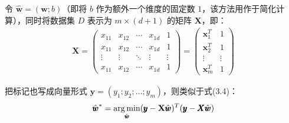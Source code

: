 \documentclass[../studies-ml.tex]{subfiles}
\begin{document}
\bigbreak

令 $\hat{\pmb{w}} = (\pmb{w}; b)$（即将 $b$ 作为额外一个维度的固定数 $1$，该方法用作于简化计算），同时将数据集 $D$ 表示为 $m \times (d + 1)$ 的矩阵
$\mathbf{X}$，即：
\begin{align*}
  \pmb{X} =
  \left(
  \begin{matrix}
      x_{11} & x_{12} & \cdots & x_{1d} & 1      \\
      x_{11} & x_{12} & \cdots & x_{1d} & 1      \\
      \vdots & \vdots & \ddots & \vdots & \vdots \\
      x_{11} & x_{12} & \cdots & x_{1d} & 1
    \end{matrix}
  \right) =
  \left(
  \begin{matrix}
      \pmb{x}_1^T & 1      \\
      \pmb{x}_2^T & 1      \\
      \vdots      & \vdots \\
      \pmb{x}_m^T & 1
    \end{matrix}
  \right)
\end{align*}

把标记也写成向量形式 $\pmb{y} = (y_1;y_2;\dots;y_m)$，则类似于式(3.4)：
\begin{equation}
  \hat{\pmb{w}}^* = \operatorname*{\arg\min}_{\hat{\pmb{w}}} (\pmb{y} - \mathbf{X}\hat{\pmb{w}})^T (\pmb{y} - \pmb{X}\hat{\pmb{w}})
\end{equation}

\end{document}
